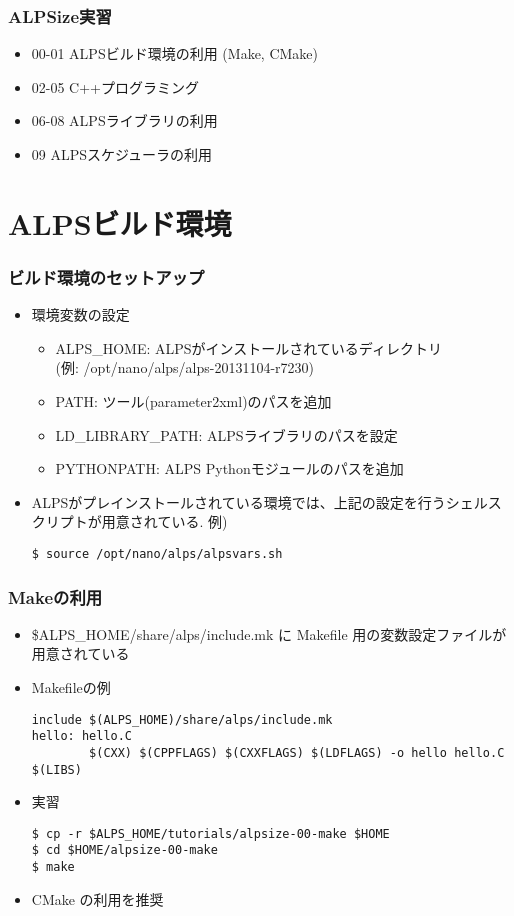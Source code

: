 \begin{frame}
  \frametitle{ALPSize実習}
  \begin{itemize}
    \setlength{\itemsep}{1em}
  \item 00-01 ALPSビルド環境の利用 (Make, CMake)
  \item 02-05 C++プログラミング
  \item 06-08 ALPSライブラリの利用
  \item 09 ALPSスケジューラの利用
  \end{itemize}
\end{frame}

\section{ALPSビルド環境}
\begin{frame}[c,fragile]
  \frametitle{ビルド環境のセットアップ}
  \begin{itemize}
    \setlength{\itemsep}{1em}
  \item 環境変数の設定
    \begin{itemize}
    \item {\color{red} ALPS\_HOME}: ALPSがインストールされているディレクトリ\\ (例: /opt/nano/alps/alps-20131104-r7230)
    \item {\color{red} PATH}: ツール(parameter2xml)のパスを追加
    \item {\color{red} LD\_LIBRARY\_PATH}: ALPSライブラリのパスを設定
    \item {\color{red} PYTHONPATH}: ALPS Pythonモジュールのパスを追加
    \end{itemize}
  \item ALPSがプレインストールされている環境では、上記の設定を行うシェルスクリプトが用意されている. 例)
\begin{lstlisting}
$ source /opt/nano/alps/alpsvars.sh
\end{lstlisting}
  \end{itemize}
\end{frame}

\begin{frame}[c,fragile]
  \frametitle{Makeの利用}
  \begin{itemize}
  \item \$ALPS\_HOME/share/alps/include.mk に Makefile 用の変数設定ファイルが用意されている
  \item Makefileの例
\begin{lstlisting}
include $(ALPS_HOME)/share/alps/include.mk
hello: hello.C
        $(CXX) $(CPPFLAGS) $(CXXFLAGS) $(LDFLAGS) -o hello hello.C $(LIBS)
\end{lstlisting}
  \item 実習
\begin{lstlisting}
$ cp -r $ALPS_HOME/tutorials/alpsize-00-make $HOME
$ cd $HOME/alpsize-00-make
$ make
\end{lstlisting}
  \item {\color{blue} CMake の利用を推奨}
  \end{itemize}
\end{frame}

